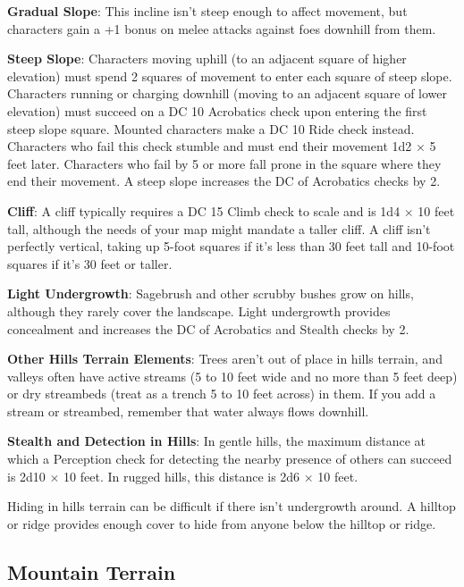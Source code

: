 				
\textbf{Gradual Slope}: This incline isn't steep enough to affect movement, but characters gain a +1 bonus on melee attacks against foes downhill from them.
				
\textbf{Steep Slope}: Characters moving uphill (to an adjacent square of higher elevation) must spend 2 squares of movement to enter each square of steep slope. Characters running or charging downhill (moving to an adjacent square of lower elevation) must succeed on a DC 10 Acrobatics check upon entering the first steep slope square. Mounted characters make a DC 10 Ride check instead. Characters who fail this check stumble and must end their movement 1d2 \mbox{$\times$} 5 feet later. Characters who fail by 5 or more fall prone in the square where they end their movement. A steep slope increases the DC of Acrobatics checks by 2.
				
\textbf{Cliff}: A cliff typically requires a DC 15 Climb check to scale and is 1d4 \mbox{$\times$} 10 feet tall, although the needs of your map might mandate a taller cliff. A cliff isn't perfectly vertical, taking up 5-foot squares if it's less than 30 feet tall and 10-foot squares if it's 30 feet or taller. 
				
\textbf{Light Undergrowth}: Sagebrush and other scrubby bushes grow on hills, although they rarely cover the landscape. Light undergrowth provides concealment and increases the DC of Acrobatics and Stealth checks by 2. 
				
\textbf{Other Hills Terrain Elements}: Trees aren't out of place in hills terrain, and valleys often have active streams (5 to 10 feet wide and no more than 5 feet deep) or dry streambeds (treat as a trench 5 to 10 feet across) in them. If you add a stream or streambed, remember that water always flows downhill.
				
\textbf{Stealth and Detection in Hills}: In gentle hills, the maximum distance at which a Perception check for detecting the nearby presence of others can succeed is 2d10 \mbox{$\times$} 10 feet. In rugged hills, this distance is 2d6 \mbox{$\times$} 10 feet.
				
Hiding in hills terrain can be difficult if there isn't undergrowth around. A hilltop or ridge provides enough cover to hide from anyone below the hilltop or ridge.
				
\subsection{Mountain Terrain}

